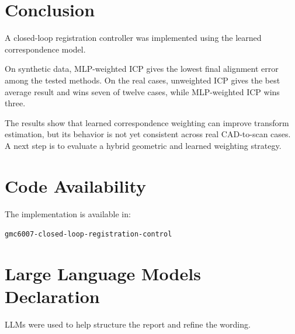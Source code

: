 \documentclass[conference]{IEEEtran}
\begin{document}
\section{Conclusion}
\label{sec:conclusion}

A closed-loop registration controller was implemented using the learned correspondence model.

On synthetic data, MLP-weighted ICP gives the lowest final alignment error among the tested methods. On the real cases, unweighted ICP gives the best average result and wins seven of twelve cases, while MLP-weighted ICP wins three.

The results show that learned correspondence weighting can improve transform estimation, but its behavior is not yet consistent across real CAD-to-scan cases. A next step is to evaluate a hybrid geometric and learned weighting strategy.

\section*{Code Availability}

The implementation is available in:

\begin{center}
\texttt{gmc6007-closed-loop-registration-control}
\end{center}

\section*{Large Language Models Declaration}

LLMs were used to help structure the report and refine the wording.

\balance


\end{document}
